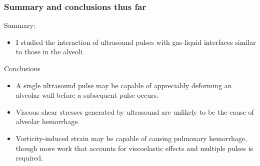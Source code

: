 \begin{frame} \frametitle{\vspace*{0.5cm}Summary and conclusions thus far}
  \small
  Summary:
  \begin{itemize}
  \item I studied the interaction of ultrasound pulses with gas-liquid interfaces similar to those in the alveoli.
  \end{itemize}

  Conclusions
  \begin{itemize}
  \item A single ultrasound pulse may be capable of appreciably deforming an alveolar wall before a subsequent pulse occurs.
  \item Viscous shear stresses generated by ultrasound are unlikely to be the cause of alveolar hemorrhage.
  \item Vorticity-induced strain may be capable of causing pulmonary
    hemorrhage, though more work that accounts for viscoelastic
    effects and multiple pulses is required.
  \end{itemize}
\end{frame}

